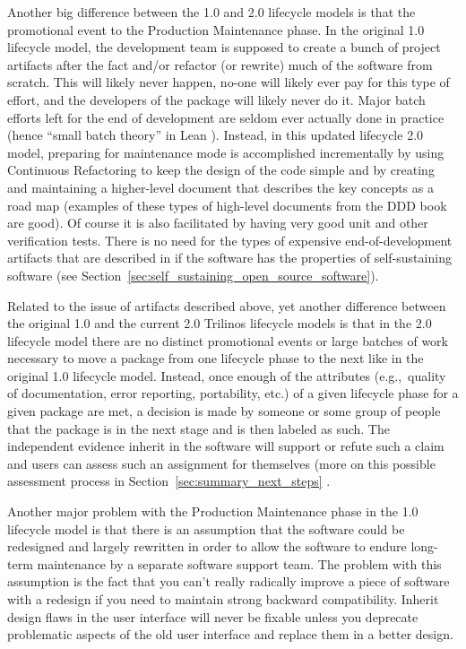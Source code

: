 \documentclass[11pt]{SANDreport}
\begin{document}
Another big difference between the 1.0 and 2.0 lifecycle models is
that the promotional event to the Production Maintenance phase.  In
the original 1.0 lifecycle model, the development team is supposed to
create a bunch of project artifacts after the fact and/or refactor (or
rewrite) much of the software from scratch.  This will likely never
happen, no-one will likely ever pay for this type of effort, and the
developers of the package will likely never do it.  Major batch
efforts left for the end of development are seldom ever actually done
in practice (hence ``small batch theory'' in Lean
{}\cite{ImplementingLeanSoftwareDevelopment}).  Instead, in this
updated lifecycle 2.0 model, preparing for maintenance mode is
accomplished incrementally by using Continuous Refactoring to keep
the design of the code simple and by creating and maintaining a
higher-level document that describes the key concepts as a road map
(examples of these types of high-level documents from the DDD book are
good).  Of course it is also facilitated by having very good unit and
other verification tests.  There is no need for the types of expensive
end-of-development artifacts that are described in
{}\cite{TrilinosLifecycleModel2007} if the software has the properties
of self-sustaining software (see
Section~\ref{sec:self_sustaining_open_source_software}).

Related to the issue of artifacts described above, yet another
difference between the original 1.0 and the current 2.0 Trilinos
lifecycle models is that in the 2.0 lifecycle model there are no
distinct promotional events or large batches of work necessary to move
a package from one lifecycle phase to the next like in the original
1.0 lifecycle model.  Instead, once enough of the attributes (e.g.,\
quality of documentation, error reporting, portability, etc.) of a
given lifecycle phase for a given package are met, a decision is made
by someone or some group of people that the package is in the next
stage and is then labeled as such.  The independent evidence inherit
in the software will support or refute such a claim and users can
assess such an assignment for themselves (more on this possible
assessment process in Section~\ref{sec:summary_next_steps} .

Another major problem with the Production Maintenance phase in the 1.0
lifecycle model is that there is an assumption that the software could
be redesigned and largely rewritten in order to allow the software to
endure long-term maintenance by a separate software support team.  The
problem with this assumption is the fact that you can't really
radically improve a piece of software with a redesign if you need to
maintain strong backward compatibility.  Inherit design flaws in the
user interface will never be fixable unless you deprecate problematic
aspects of the old user interface and replace them in a better design.
\end{document}
